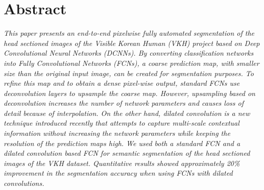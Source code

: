 \documentclass[a4paper]{mva_style}
\begin{document}
\section*{\centering Abstract}
\textit{This paper presents an end-to-end pixelwise fully automated segmentation of the head sectioned images of the Visible Korean Human (VKH) project based on Deep Convolutional Neural Networks (DCNNs). By converting classification networks into Fully Convolutional Networks (FCNs), a coarse prediction map, with smaller size than the original input image, can be created for segmentation purposes. To refine this map and to obtain a dense pixel-wise output, standard FCNs use deconvolution layers to upsample the coarse map. However, upsampling based on deconvolution increases the number of network parameters and causes loss of detail because of interpolation. On the other hand, dilated convolution is a new technique introduced recently that attempts to capture multi-scale contextual information without increasing the network parameters while keeping the resolution of the prediction maps high. We used both a standard FCN and a dilated convolution based FCN for semantic segmentation of the head sectioned images of the VKH dataset. Quantitative results showed approximately 20\% improvement in the segmentation accuracy when using FCNs with dilated convolutions.}
\end{document}
